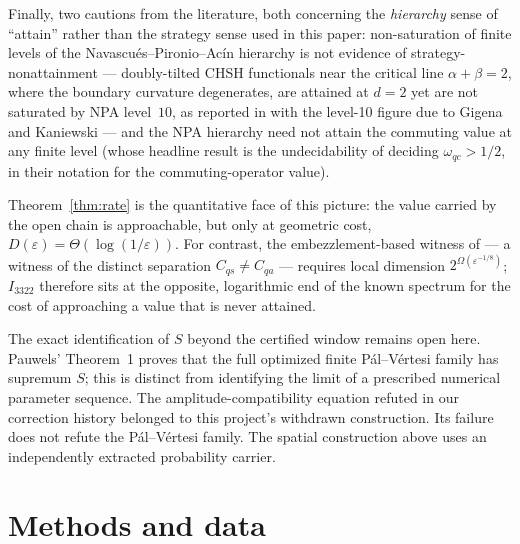 \documentclass[11pt]{article}
\theoremstyle{remark}
\newcommand{\Cqs}{C_{qs}}
\newcommand{\eps}{\varepsilon}
\begin{document}
Finally, two cautions from the literature, both
concerning the \emph{hierarchy} sense of ``attain'' rather than the
strategy sense used in this paper: non-saturation of finite levels of the
Navascu\'es--Pironio--Ac\'in hierarchy \cite{NPA} is not evidence of
strategy-nonattainment --- doubly-tilted CHSH functionals near the critical
line $\alpha+\beta=2$, where the boundary curvature degenerates, are attained
at $d=2$ yet are not saturated by NPA level~$10$, as reported in
\cite{Pakhunov} with the level-10 figure due to Gigena and Kaniewski
\cite{GigenaKaniewski} --- and the NPA hierarchy need not attain the commuting value
at any finite level \cite{Fanizza} (whose headline result is the
undecidability of deciding $\omega_{qc}>1/2$, in their notation for the
commuting-operator value).

Theorem~\ref{thm:rate} is the quantitative face of this picture: the value
carried by the open chain is approachable, but only at geometric cost,
$D(\eps)=\Theta(\log(1/\eps))$. For contrast, the embezzlement-based
witness of \cite{Coladangelo} --- a witness of the distinct separation
$\Cqs\neq C_{qa}$ --- requires local dimension
$2^{\Omega(\eps^{-1/8})}$; $I_{3322}$ therefore sits at the opposite,
logarithmic end of the known spectrum for the cost of approaching a value
that is never attained.

The exact identification of $S$ beyond the certified window remains open
here. Pauwels' Theorem~1 \cite{Pauwels} proves that the full optimized
finite P\'al--V\'ertesi family has supremum $S$; this is distinct from
identifying the limit of a prescribed numerical parameter sequence.
The amplitude-compatibility equation refuted in our correction history
belonged to this project's withdrawn construction. Its failure does not
refute the P\'al--V\'ertesi family. The spatial construction above uses an
independently extracted probability carrier.

\section{Methods and data}\label{sec:methods}
\end{document}
